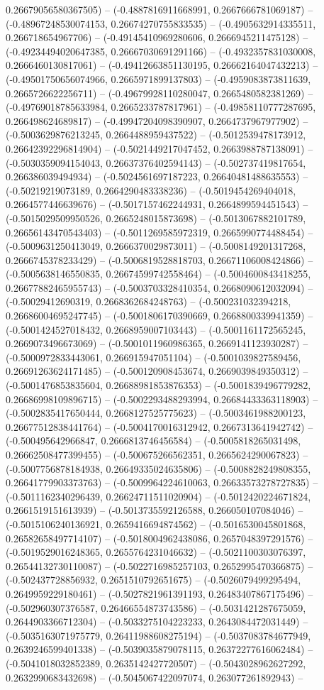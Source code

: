 0.26679056580367505) -- (-0.4887816911668991, 0.2667666781069187) -- (-0.48967248530074153, 0.26674270755833535) -- (-0.4905632914335511, 0.266718654967706) -- (-0.49145410969280606, 0.2666945211475128) -- (-0.49234494020647385, 0.26667030691291166) -- (-0.4932357831030008, 0.2666460130817061) -- (-0.49412663851130195, 0.26662164047432213) -- (-0.49501750656074966, 0.2665971899137803) -- (-0.4959083873811639, 0.2665726622256711) -- (-0.49679928110280047, 0.2665480582381269) -- (-0.49769018785633984, 0.2665233787817961) -- (-0.49858110777287695, 0.266498624689817) -- (-0.49947204098390907, 0.2664737967977902) -- (-0.5003629876213245, 0.2664488959437522) -- (-0.5012539478173912, 0.26642392296814904) -- (-0.5021449217047452, 0.2663988787138091) -- (-0.5030359094154043, 0.26637376402594143) -- (-0.502737419817654, 0.266386039494934) -- (-0.5024561697187223, 0.26640481488635553) -- (-0.50219219073189, 0.2664290483338236) -- (-0.5019454269404018, 0.2664577446639676) -- (-0.5017157462244931, 0.2664899594451543) -- (-0.5015029509950526, 0.2665248015873698) -- (-0.5013067882101789, 0.26656143470543403) -- (-0.5011269585972319, 0.2665990774488454) -- (-0.5009631250413049, 0.2666370029873011) -- (-0.5008149201317268, 0.2666745378233429) -- (-0.5006819528818703, 0.26671106008424866) -- (-0.5005638146550835, 0.26674599742558464) -- (-0.5004600843418255, 0.26677882465955743) -- (-0.5003703328410354, 0.2668090612032094) -- (-0.50029412690319, 0.2668362684248763) -- (-0.500231032394218, 0.26686004695247745) -- (-0.5001806170390669, 0.2668800339941359) -- (-0.5001424527018432, 0.2668959007103443) -- (-0.5001161172565245, 0.2669073496673069) -- (-0.5001011960986365, 0.2669141123930287) -- (-0.5000972833443061, 0.266915947051104) -- (-0.5001039827589456, 0.26691263624171485) -- (-0.500120908453674, 0.2669039849350312) -- (-0.5001476853835604, 0.26688981853876353) -- (-0.5001839496779282, 0.26686998109896715) -- (-0.5002293488293994, 0.26684433363118903) -- (-0.5002835417650444, 0.2668127525775623) -- (-0.5003461988200123, 0.26677512838441764) -- (-0.5004170016312942, 0.2667313641942742) -- (-0.500495642966847, 0.2666813746456584) -- (-0.5005818265031498, 0.26662508477399455) -- (-0.500675266562351, 0.2665624290067823) -- (-0.5007756878184938, 0.26649335024635806) -- (-0.5008828249808355, 0.26641779903373763) -- (-0.5009964224610063, 0.26633573278727835) -- (-0.5011162340296439, 0.26624711511020904) -- (-0.5012420224671824, 0.2661519151613939) -- (-0.5013735592126588, 0.266050107084046) -- (-0.5015106240136921, 0.2659416694874562) -- (-0.5016530045801868, 0.26582658497714107) -- (-0.5018004962438086, 0.2657048397291576) -- (-0.5019529016248365, 0.2655764231046632) -- (-0.5021100303076397, 0.26544132730110087) -- (-0.5022716985257103, 0.2652995470366875) -- (-0.502437728856932, 0.2651510792651675) -- (-0.5026079499295494, 0.2649959229180461) -- (-0.5027821961391193, 0.26483407867175496) -- (-0.502960307376587, 0.26466554873743586) -- (-0.5031421287675059, 0.2644903366712304) -- (-0.5033275104223233, 0.2643084472031449) -- (-0.5035163071975779, 0.26411988608275194) -- (-0.5037083784677949, 0.2639246599401338) -- (-0.5039035879078115, 0.26372277616062484) -- (-0.5041018032852389, 0.2635142427720507) -- (-0.5043028962627292, 0.2632990683432698) -- (-0.5045067422097074, 0.263077261892943) -- 